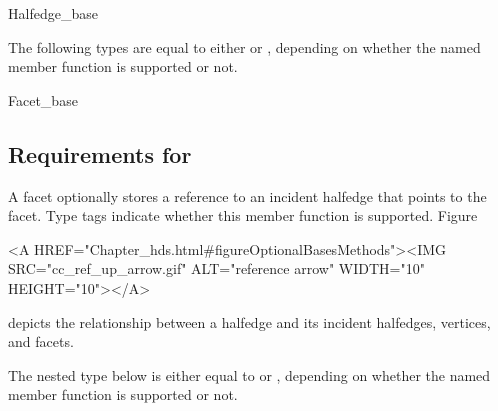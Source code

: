 \begin{ccClass}{Halfedge_base}
\ccGlue
{}
\ccGlue
{}
\ccGlue
{}
\ccGlue
{}




The following types are equal to either  or
, depending on whether the named member function is
supported or not.

\ccGlue
{}
\ccGlue
{}

\end{ccClass}

\begin{ccClass}{Facet_base}
\subsection{Requirements for \protect{}}
\label{sectionHdsFacetBase}


\ccDefinition

A facet optionally stores a reference to an incident halfedge that
points to the facet. Type tags indicate whether this member function
is supported.  
Figure~\ccTexHtml{\ref{figureOptionalBasesMethods}}{}\begin{ccHtmlOnly}
  <A HREF="Chapter_hds.html#figureOptionalBasesMethods"><IMG 
  SRC="cc_ref_up_arrow.gif" ALT="reference arrow" WIDTH="10" HEIGHT="10"></A>
\end{ccHtmlOnly}
depicts the relationship between a halfedge and its incident
halfedges, vertices, and facets.



\ccCreation

\ccGlue
{}

\ccOperations

\ccGlue
{}




The nested type below is either equal to  or
, depending on whether the named member function is
supported or not. 


\end{ccClass}

